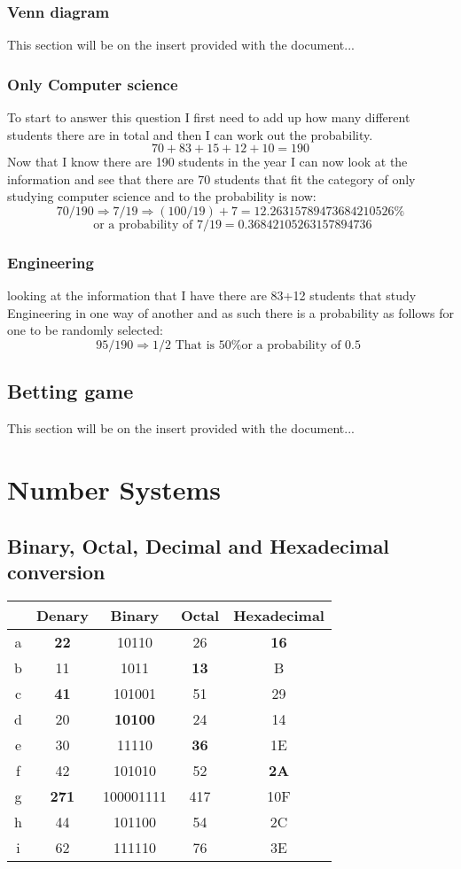 \documentclass{article}
\begin{document}
\subsubsection{Venn diagram}
This section will be on the insert provided with the document...
\subsubsection{Only Computer science}
To start to answer this question I first need to add up how many different students there are in total and then I can work out the probability. 
\[
	70+83+15+12+10 = 190
\]
Now that I know there are 190 students in the year I can now look at the information and see that there are 70 students that fit the category of only studying computer science and to the probability is now:
\[
	70/190 \Rightarrow 7/19 \Rightarrow (100/ 19)+7 = 12.26315789473684210526\% 
\]
\[
	\mbox{ or a probability of } 7/19 = 0.36842105263157894736  
\]
\subsubsection{Engineering}
looking at the information that I have there are 83+12 students that study Engineering in one way of another and as such there is a probability as follows for one to be randomly selected:
\[
	95 / 190 \Rightarrow 1/2 \mbox{ That is 50\% or a probability of 0.5 }
\]
\subsection{Betting game}
This section will be on the insert provided with the document...
\section{Number Systems}
\subsection{Binary, Octal, Decimal and Hexadecimal conversion}
\begin{center}
\begin{tabular}{ ||c|c c c c|| } 
 \hline
   & Denary & Binary & Octal & Hexadecimal \\
 \hline
 \hline
 a & \textbf{22} & 10110 & 26 & \textbf{16} \\ 
 \hline
 b & 11 & 1011 & \textbf{13} & B \\ 
 \hline
 c & \textbf{41} & 101001 & 51 & 29 \\ 
 \hline
 d & 20 & \textbf{10100} & 24 & 14 \\ 
 \hline
 e & 30 & 11110 & \textbf{36} & 1E \\ 
 \hline
 f & 42 & 101010 & 52 & \textbf{2A} \\
 \hline
 g & \textbf{271} & 100001111 & 417 & 10F\\ 
 \hline
 h & 44 & 101100 & 54 & 2C \\ 
 \hline
 i & 62 & 111110 & 76 & 3E \\ 
 \hline
\end{tabular}
\end{center}
\end{document}
